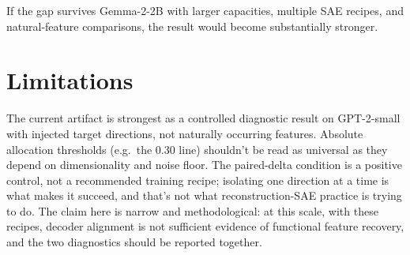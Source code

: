 \documentclass[10pt]{article}
\begin{document}
If the gap survives Gemma-2-2B with larger capacities, multiple SAE recipes, and natural-feature comparisons, the result would become substantially stronger.

\section*{Limitations}

The current artifact is strongest as a controlled diagnostic result on GPT-2-small with injected target directions, not naturally occurring features. Absolute allocation thresholds (e.g.\ the 0.30 line) shouldn't be read as universal as they depend on dimensionality and noise floor. The paired-delta condition is a positive control, not a recommended training recipe; isolating one direction at a time is what makes it succeed, and that's not what reconstruction-SAE practice is trying to do. The claim here is narrow and methodological: at this scale, with these recipes, decoder alignment is not sufficient evidence of functional feature recovery, and the two diagnostics should be reported together.
\end{document}
